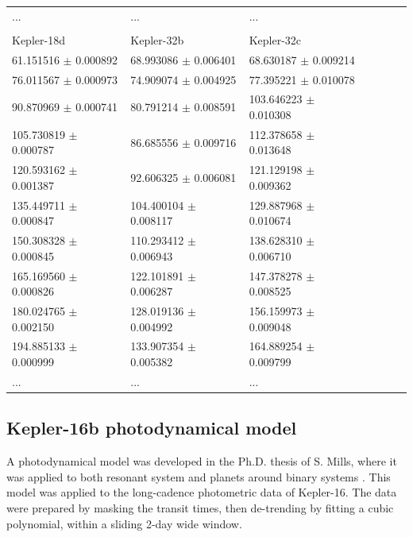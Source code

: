 \begin{table}
\begin{tabular}{lllllll}
      ... & ... & ... \\
      \\
      \hline\hline
      Kepler-18d &  Kepler-32b &  Kepler-32c \\
      \hline
      61.151516 $\pm$     0.000892 &   68.993086 $\pm$     0.006401 &   68.630187 $\pm$     0.009214 \\
      76.011567 $\pm$     0.000973 &   74.909074 $\pm$     0.004925 &   77.395221 $\pm$     0.010078 \\
      90.870969 $\pm$     0.000741 &   80.791214 $\pm$     0.008591 &  103.646223 $\pm$     0.010308 \\
      105.730819 $\pm$     0.000787 &   86.685556 $\pm$     0.009716 &  112.378658 $\pm$     0.013648 \\
      120.593162 $\pm$     0.001387 &   92.606325 $\pm$     0.006081 &  121.129198 $\pm$     0.009362 \\
      135.449711 $\pm$     0.000847 &  104.400104 $\pm$     0.008117 &  129.887968 $\pm$     0.010674 \\
      150.308328 $\pm$     0.000845 &  110.293412 $\pm$     0.006943 &  138.628310 $\pm$     0.006710 \\
      165.169560 $\pm$     0.000826 &  122.101891 $\pm$     0.006287 &  147.378278 $\pm$     0.008525 \\
      180.024765 $\pm$     0.002150 &  128.019136 $\pm$     0.004992 &  156.159973 $\pm$     0.009048 \\
      194.885133 $\pm$     0.000999 &  133.907354 $\pm$     0.005382 &  164.889254 $\pm$     0.009799 \\
      ... & ... & ... \\
      \hline
    \end{tabular}
\end{table}


\subsection{Kepler-16b photodynamical model}

A photodynamical model was developed in the Ph.D. thesis of S. Mills, where it was applied to both resonant system \citep{Mills2016} and planets around binary systems \citep{Welsh2015}. This model was applied to the long-cadence photometric data of Kepler-16. The data were prepared by masking the transit times, then de-trending by fitting a cubic polynomial, within a sliding 2-day wide window.

